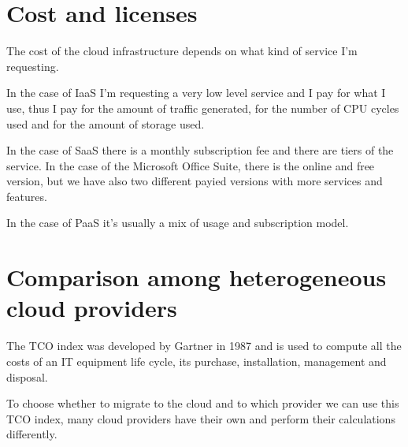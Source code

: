 \section{Cost and licenses}
The cost of the cloud infrastructure depends on what kind of service I'm requesting.

In the case of IaaS I'm requesting a very low level service and I pay for what I use, thus I pay for the amount of traffic generated, for the number of CPU cycles used and for the amount of storage used.

In the case of SaaS there is a monthly subscription fee and there are tiers of the service. In the case of the Microsoft Office Suite, there is the online and free version, but we have also two different payied versions with more services and features.

In the case of PaaS it's usually a mix of usage and subscription model.
\section{Comparison among heterogeneous cloud providers}
The TCO index was developed by Gartner in 1987 and is used to compute all the costs of an IT equipment life cycle, its purchase, installation, management and disposal.

To choose whether to migrate to the cloud and to which provider we can use this TCO index, many cloud providers have their own and perform their calculations differently.
